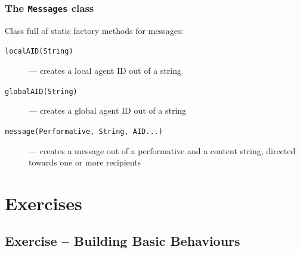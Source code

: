 \documentclass{beamer}\mode<presentation>{\usetheme{AMSCesenaPurpleAndGold}}
\begin{document}
\begin{frame}\frametitle{The \texttt{Message\textbf{s}} class}
    Class full of \alert{static factory methods} for messages:
    \begin{description}
        \item[\texttt{localAID(String)}] --- creates a \alert{local} agent ID out of a string
        \item[\texttt{globalAID(String)}] --- creates a \alert{global} agent ID out of a string
        \item[\texttt{message(Performative, String, AID...)}] --- creates a message out of a performative and a content string, directed towards one or more recipients
    \end{description}

\end{frame}

\section{Exercises}

\startExercise

\subsection{Exercise \currentExercise{} -- Building Basic Behaviours}
\end{document}
